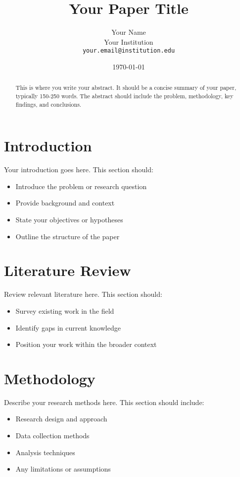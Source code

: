 \documentclass[11pt]{article}
\title{Your Paper Title}
\author{Your Name \\
        Your Institution \\
        \texttt{your.email@institution.edu}}
\date{\today}
\begin{document}
\maketitle

\begin{abstract}
This is where you write your abstract. It should be a concise summary of your paper, typically 150-250 words. The abstract should include the problem, methodology, key findings, and conclusions.
\end{abstract}

\section{Introduction}
Your introduction goes here. This section should:
\begin{itemize}
    \item Introduce the problem or research question
    \item Provide background and context
    \item State your objectives or hypotheses
    \item Outline the structure of the paper
\end{itemize}

\section{Literature Review}
Review relevant literature here. This section should:
\begin{itemize}
    \item Survey existing work in the field
    \item Identify gaps in current knowledge
    \item Position your work within the broader context
\end{itemize}

\section{Methodology}
Describe your research methods here. This section should include:
\begin{itemize}
    \item Research design and approach
    \item Data collection methods
    \item Analysis techniques
    \item Any limitations or assumptions
\end{itemize}
\end{document}
